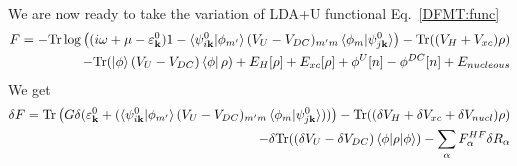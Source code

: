 \documentclass[aps,prb,floatfix,epsfig,singlecolumn,showpacs,preprintnumbers]{revtex4}
\newcommand{\vk}{{\mathbf{k}}}
\newcommand{\Tr}{\mathrm{Tr}}
\begin{document}
% 

We are now ready to take the variation of LDA+U functional Eq.~\ref{DFMT:func}
\begin{eqnarray}
F = -\Tr\log\left( (i\omega+\mu-\varepsilon^0_{\vk}) 1-\braket{\psi^0_{i\vk}|\phi_{m'}}(V_U-V_{DC})_{m'm}\braket{\phi_m|\psi^0_{j\vk}} \right) 
- \Tr((V_H+V_{xc})\rho) \nonumber\\
- \Tr( \ket{\phi}(V_U-V_{DC})\bra{\phi} \rho)
+ E_{H}[\rho]+E_{xc}[\rho] 
+ \phi^{U}[n]-\phi^{DC}[n] 
+ E_{nucleous}
\end{eqnarray}
We get
\begin{eqnarray}
\delta F = \Tr\left( G \delta (\varepsilon^0_{\vk}+(\braket{\psi^0_{i\vk}|\phi_{m'}}(V_U-V_{DC})_{m'm}\braket{\phi_m|\psi^0_{j\vk}})) \right)
- \Tr((\delta V_H+\delta V_{xc}+\delta V_{nucl})\rho) \nonumber\\
-\delta \Tr( (\delta V_U-\delta V_{DC})\braket{\phi| \rho|\phi})
-\sum_\alpha F^{HF}_\alpha \delta R_\alpha
\label{Eq:230}
\end{eqnarray}
\end{document}
